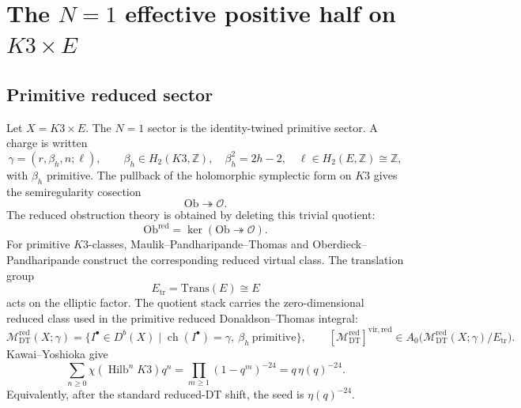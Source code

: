 \providecommand{\kch}{\kappa_{\mathrm{ch}}}
\providecommand{\kcat}{\kappa_{\mathrm{cat}}}
\providecommand{\kBKM}{\kappa_{\mathrm{BKM}}}
\providecommand{\kfib}{\kappa_{\mathrm{fiber}}}
\providecommand{\Meff}{\mathcal{M}^{+}_{\mathrm{eff}}}
\providecommand{\Mred}{\mathcal{M}^{\mathrm{red}}_{\mathrm{DT}}}
\providecommand{\virred}{[\Mred]^{\mathrm{vir,red}}}
\providecommand{\Etr}{E_{\mathrm{tr}}}
\providecommand{\Trans}{\mathrm{Trans}}
\providecommand{\PhiTenOP}{\Phi_{10}^{\mathrm{OP}}}
\providecommand{\PhiTenUn}{\Phi_{10}^{\mathrm{un}}}
\providecommand{\DeltaFive}{\Delta_{5}}
\providecommand{\DFive}{D_{5}}
\providecommand{\gDeltaFive}{\mathfrak{g}_{\DeltaFive}}
\providecommand{\gBPS}{\mathfrak{g}_{\mathrm{BPS}}}
\providecommand{\Yplus}{Y^{+}}
\providecommand{\CoHAred}{\mathrm{CoHA}^{\mathrm{red}}}
\providecommand{\K}{K3}
\providecommand{\Db}{D^b}

\section*{The \(N=1\) effective positive half on \(\K\times E\)}
\label{sec:n1-effective-positive-half}

\subsection*{Primitive reduced sector}

Let \(X=\K\times E\). The \(N=1\) sector is the identity-twined
primitive sector. A charge is written
\[
  \gamma=(r,\beta_h,n;\ell),
  \qquad
  \beta_h\in H_2(\K,\mathbb Z),\quad
  \beta_h^2=2h-2,\quad
  \ell\in H_2(E,\mathbb Z)\cong\mathbb Z,
\]
with \(\beta_h\) primitive. The pullback of the holomorphic symplectic
form on \(\K\) gives the semiregularity cosection
\[
  \mathrm{Ob}\twoheadrightarrow\mathcal O .
\]
The reduced obstruction theory is obtained by deleting this trivial
quotient:
\[
  \mathrm{Ob}^{\mathrm{red}}
  =
  \ker(\mathrm{Ob}\twoheadrightarrow\mathcal O).
\]
For primitive \(\K\)-classes, Maulik--Pandharipande--Thomas and
Oberdieck--Pandharipande construct the corresponding reduced virtual
class. The translation group
\[
  \Etr=\Trans(E)\cong E
\]
acts on the elliptic factor. The quotient stack carries the
zero-dimensional reduced class used in the primitive reduced
Donaldson--Thomas integral:
\[
  \Mred(X;\gamma)
  =
  \bigl\{I^\bullet\in\Db(X)\mid
  \operatorname{ch}(I^\bullet)=\gamma,\ \beta_h\ \mathrm{primitive}\bigr\},
  \qquad
  \virred\in A_0\bigl(\Mred(X;\gamma)/\Etr\bigr).
\]
Kawai--Yoshioka give
\[
  \sum_{n\geq 0}\chi(\operatorname{Hilb}^n\K)q^n
  =
  \prod_{m\geq 1}(1-q^m)^{-24}
  =
  q\,\eta(q)^{-24}.
\]
Equivalently, after the standard reduced-DT shift, the seed is
\(\eta(q)^{-24}\).


